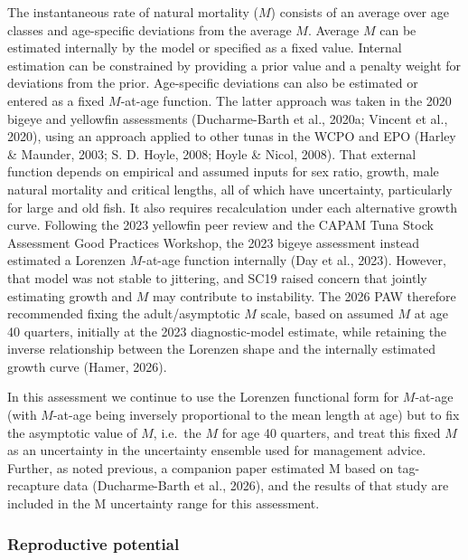 \documentclass[
  english,
  a4paper,
  a4paper,
  11pt]{SCreport}
\begin{document}
The instantaneous rate of natural mortality (\(M\)) consists of an
average over age classes and age-specific deviations from the average
\(M\). Average \(M\) can be estimated internally by the model or
specified as a fixed value. Internal estimation can be constrained by
providing a prior value and a penalty weight for deviations from the
prior. Age-specific deviations can also be estimated or entered as a
fixed \(M\)-at-age function. The latter approach was taken in the 2020
bigeye and yellowfin assessments (Ducharme-Barth et al., 2020a; Vincent
et al., 2020), using an approach applied to other tunas in the WCPO and
EPO (Harley \& Maunder, 2003; S. D. Hoyle, 2008; Hoyle \& Nicol, 2008).
That external function depends on empirical and assumed inputs for sex
ratio, growth, male natural mortality and critical lengths, all of which
have uncertainty, particularly for large and old fish. It also requires
recalculation under each alternative growth curve. Following the 2023
yellowfin peer review and the CAPAM Tuna Stock Assessment Good Practices
Workshop, the 2023 bigeye assessment instead estimated a Lorenzen
\(M\)-at-age function internally (Day et al., 2023). However, that model
was not stable to jittering, and SC19 raised concern that jointly
estimating growth and \(M\) may contribute to instability. The 2026 PAW
therefore recommended fixing the adult/asymptotic \(M\) scale, based on
assumed \(M\) at age 40 quarters, initially at the 2023 diagnostic-model
estimate, while retaining the inverse relationship between the Lorenzen
shape and the internally estimated growth curve (Hamer, 2026).

In this assessment we continue to use the Lorenzen functional form for
\(M\)-at-age (with \(M\)-at-age being inversely proportional to the mean
length at age) but to fix the asymptotic value of \(M\), i.e.~the \(M\)
for age 40 quarters, and treat this fixed \(M\) as an uncertainty in the
uncertainty ensemble used for management advice. Further, as noted
previous, a companion paper estimated M based on tag-recapture data
(Ducharme-Barth et al., 2026), and the results of that study are
included in the M uncertainty range for this assessment.

\subsubsection{Reproductive
potential}\label{sec-model-reproductive-potential}
\end{document}
